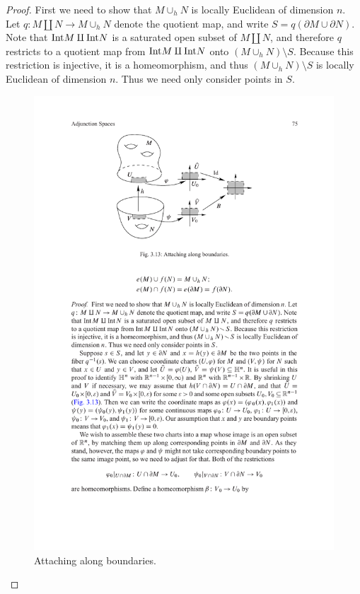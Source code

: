 \begin{proof}
First we need to show that $M\cup_h N$ is locally Euclidean of dimension $n$. Let $q:M\amalg N\to M\cup_h N$ denote the quotient map, and write $S=q(\partial M\cup\partial N)$. Note that $\mathrm{Int} M\amalg\mathrm{Int} N$ is a saturated open subset of $M\amalg N$, and therefore $q$ restricts to a quotient map from $\mathrm{Int} M\amalg\mathrm{Int} N$ onto $(M\cup_h N)\setminus S$. Because this restriction is injective, it is a homeomorphism, and thus $(M\cup_hN)\setminus S$ is locally Euclidean of dimension $n$. Thus we need only consider points in $S$.
\begin{figure}[htbp]
\centering
\includegraphics{attach-manifold}
\caption{Attaching along boundaries.}
\end{figure}


\end{proof}
